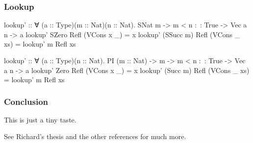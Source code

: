 \documentclass{beamer}
\begin{document}
\begin{frame}[fragile]\frametitle{Lookup}
\begin{semiverbatim}
lookup' :: ∀ (a :: Type)(m :: Nat)(n :: Nat).
           SNat m -> m < n :~: True -> Vec a n -> a
lookup' SZero     Refl (VCons x _)  = x
lookup' (SSucc m) Refl (VCons _ xs) = lookup' m Refl xs

lookup' :: ∀ (a :: Type)(n :: Nat). PI (m :: Nat) ->
           m -> m < n :~: True -> Vec a n -> a
lookup' Zero     Refl (VCons x _)  = x
lookup' (Succ m) Refl (VCons _ xs) = lookup' m Refl xs

\end{semiverbatim}
\end{frame}

\begin{frame}\frametitle{Conclusion}
This is just a tiny taste.

\medskip  

See Richard's thesis and the other references for much more.  
\end{frame}
\end{document}
